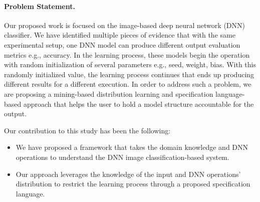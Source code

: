 \paragraph{Problem Statement. }Our proposed work is focused on the image-based deep neural network (DNN) classifier. We have identified multiple pieces of evidence that with the same experimental setup, one DNN model can produce different output evaluation metrics e.g., accuracy. In the learning process, these models begin the operation with random initialization of several parameters e.g., seed, weight, bias. With this randomly initialized value, the learning process continues that ends up producing different results for a different execution. In order to address such a problem, we are proposing a mining-based distribution learning and specification language-based approach that helps the user to hold a model structure accountable for the output.


Our contribution to this study has been the following:
\begin{itemize}
	\item We have proposed a framework that takes the domain knowledge and DNN operations to understand the DNN image classification-based system.
	\item Our approach leverages the knowledge of the input and DNN operations' distribution to restrict the learning process through a proposed specification language.
\end{itemize}
